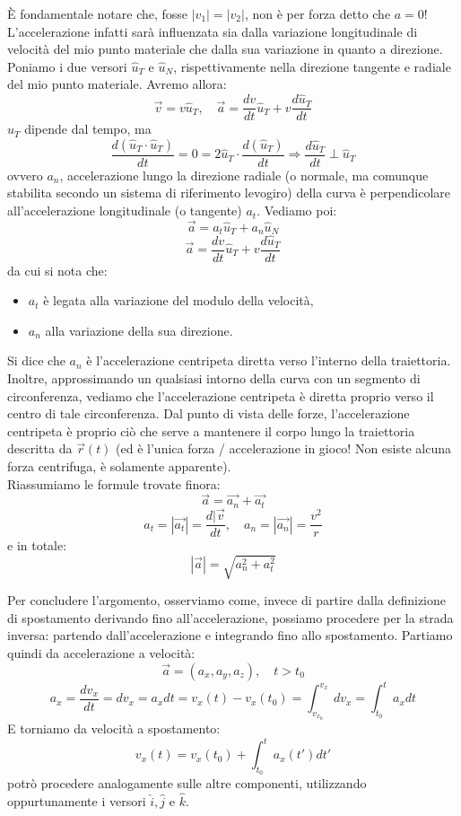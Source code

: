 \documentclass[a4paper,12pt]{article}
\begin{document}
È fondamentale notare che, fosse $|v_1| = |v_2|$, non è per forza detto che $a=0$! L'accelerazione infatti
sarà influenzata sia dalla variazione longitudinale di velocità del mio punto materiale che dalla sua variazione
in quanto a direzione. Poniamo i due versori $\hat{u}_T$ e $\hat{u}_N$, rispettivamente nella direzione tangente
e radiale del mio punto materiale. Avremo allora:
$$ \vec{v} = v\hat{u}_T, \quad \vec{a} = \frac{dv}{dt}\hat{u}_T + v \frac{d\hat{u}_T}{dt} $$
$\hat{u}_T$ dipende dal tempo, ma
$$ \frac{d(\hat{u}_T \cdot \hat{u}_T)}{dt} = 0 = 2\hat{u}_T \cdot \frac{d(\hat{u}_T)}{dt} \Rightarrow \frac{d\hat{u}_T}{dt} \perp \hat{u}_T $$
ovvero $a_n$, accelerazione lungo la direzione radiale (o normale, ma comunque stabilita secondo
un sistema di riferimento levogiro) della curva è perpendicolare all'accelerazione longitudinale (o tangente) $a_t$. Vediamo poi:
$$ \vec{a} = a_t\hat{u}_T + a_n\hat{u}_N $$
$$ \vec{a} = \frac{dv}{dt}\hat{u}_T + v\frac{d\hat{u}_T}{dt} $$
da cui si nota che:
\begin{itemize}
  \item $a_t$ è legata alla variazione del modulo della velocità,
  \item $a_n$ alla variazione della sua direzione.
\end{itemize}
Si dice che $a_n$ è l'accelerazione centripeta diretta verso l'interno della traiettoria. Inoltre, approssimando
un qualsiasi intorno della curva con un segmento di circonferenza, vediamo che l'accelerazione centripeta è diretta
proprio verso il centro di tale circonferenza. Dal punto di vista delle forze, l'accelerazione centripeta è proprio
ciò che serve a mantenere il corpo lungo la traiettoria descritta da $\vec{r}(t)$ (ed è l'unica forza / accelerazione
in gioco! Non esiste alcuna forza centrifuga, è solamente apparente). \\
Riassumiamo le formule trovate finora:
$$ \vec{a} = \vec{a_n} + \vec{a_t} $$
$$ a_t = |\vec{a_t}| = \frac{d|\vec{v}}{dt}, \quad a_n = |\vec{a_n}| = \frac{v^2}{r} $$
e in totale:
$$ |\vec{a}| = \sqrt{a_n ^ 2 + a_t ^ 2}$$
\par\smallskip
Per concludere l'argomento, osserviamo come, invece di partire dalla definizione di spostamento derivando fino
all'accelerazione, possiamo procedere per la strada inversa: partendo dall'accelerazione e integrando fino allo
spostamento. Partiamo quindi da accelerazione a velocità:
$$ \vec{a} = (a_x, a_y, a_z), \quad t > t_0 $$
$$ a_x = \frac{dv_x}{dt} = dv_x = a_xdt = v_x(t) - v_x(t_0) = \int_{v_{x_0}}^{v_x} dv_x = \int_{t_0}^{t} a_xdt $$
E torniamo da velocità a spostamento:
$$ v_x(t) = v_x(t_0) + \int_{t_0}^{t} a_x(t')dt' $$
potrò procedere analogamente sulle altre componenti, utilizzando oppurtunamente i versori $\hat{i}, \hat{j}$ e $\hat{k}$.
\end{document}
